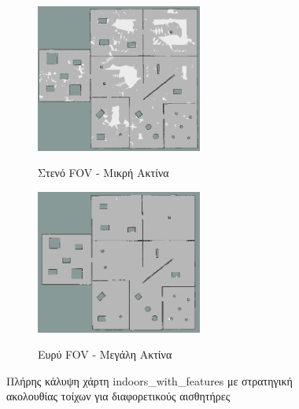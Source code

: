 \begin{figure}[H]
     \centering
     \captionsetup{justification=centering}
     \begin{subfigure}[b]{\textwidth}
         \centering
         \includegraphics[width=0.6\textwidth]{./images/chapter6/indoors_with_features_wall_follow_coverage_narrow_short.png}
         \label{fig:indoors_with_features_wall_follow_coverage_narrow_short}
         \caption{Στενό FOV - Μικρή Ακτίνα}
     \end{subfigure}
     \begin{subfigure}[b]{\textwidth}
         \centering
         \includegraphics[width=0.6\textwidth]{./images/chapter6/indoors_with_features_wall_follow_coverage_wide_long.png}
         \label{fig:indoors_with_features_wall_follow_coverage_wide_long}
         \caption{Ευρύ FOV - Μεγάλη Ακτίνα}
     \end{subfigure}
     \caption{Πλήρης κάλυψη χάρτη indoors\_with\_features με στρατηγική ακολουθίας τοίχων για διαφορετικούς αισθητήρες}
    \label{fig:indoors_with_features_wall_follow_sensors_coverage_complare}
\end{figure}


